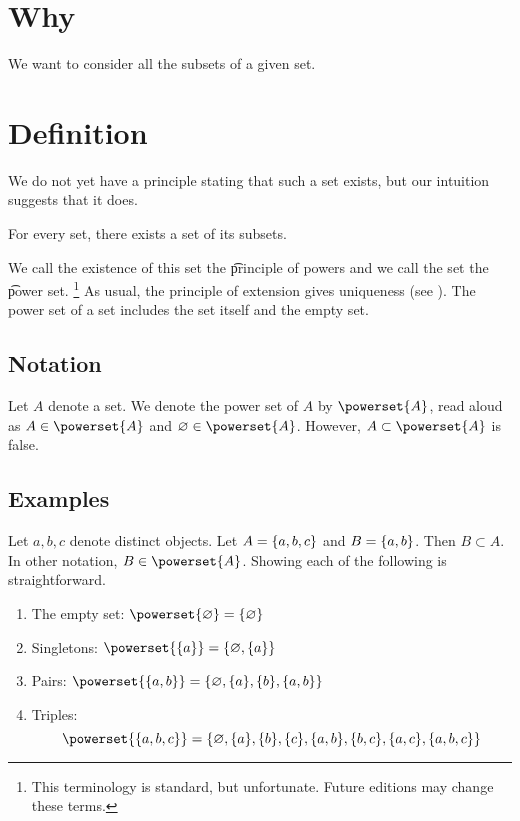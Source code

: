 
\section*{Why}

We want to consider all the subsets of a given set.

\section*{Definition}

We do not yet have a principle stating that such a set exists, but our intuition suggests that it does.

\begin{principle}[powers]
For every set, there exists a set of its subsets.\end{principle}
We call the existence of this set the \t{principle of powers} and we call the set the \t{power set}.
    \ifhmode\unskip\fi\footnote{
This terminology is standard, but unfortunate. Future editions may change these terms.
    }
As usual, the principle of extension gives uniqueness (see 
).
The power set of a set includes the set itself and the empty set.

\subsection*{Notation}

Let $A$ denote a set.
We denote the power set of $A$ by $\powerset{A}$, read aloud as 
$A \in \powerset{A}$ and $\emptyset \in \powerset{A}$.
However, $A \subset \powerset{A}$ is false.

\subsection*{Examples}

Let $a, b, c$ denote distinct objects. Let $A = \{a, b ,c\}$
and $B = \{a, b\}$. Then
$B \subset A$.
In other notation,
$B \in \powerset{A}$.
Showing each of the following is straightforward.
  \begin{enumerate}
    \item The empty set: $\powerset{\varnothing} = \set{\varnothing}$
    \item Singletons: $\powerset{\set{a}} = \set{\varnothing, \set{a}}$
    \item Pairs: $\powerset{\set{a, b}} = \set{\varnothing, \set{a}, \set{b}, \set{a, b}}$
    \item Triples:
      \[
\powerset{\set{a, b, c}} =
\{
\emptyset,
\set{a},
\set{b},
\set{c},
\set{a, b},
\set{b, c},
\set{a, c},
\set{a, b, c}
\}
      \]
  \end{enumerate}

